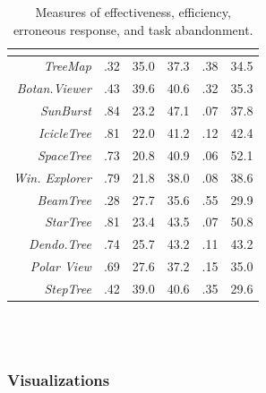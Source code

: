 \documentclass[twocolumn]{article}
\begin{document}
		\begin{table}[H]
			{\renewcommand{\arraystretch}{1.4}
				\begin{tabular}{|r*{5}{|m{.6cm}}|}
					 & \textbf{} & \textbf{} & \textbf{} & \textbf{} & \textbf{}\\
					\hline
					\textit{TreeMap} &  .32 & 35.0 & 37.3 & .38 & 34.5 \\
					\hline
					\textit{Botan.Viewer} & .43 & 39.6 & 40.6 & .32 & 35.3 \\
					\hline
					\textit{SunBurst} & .84 & 23.2 & 47.1 & .07 & 37.8 \\
					\hline
					\textit{IcicleTree } & .81 & 22.0 & 41.2 & .12 & 42.4 \\
					\hline
					\textit{SpaceTree} & .73 & 20.8 & 40.9 & .06 & 52.1 \\
					\hline
					\textit{Win. Explorer} & .79 & 21.8 & 38.0 & .08 & 38.6 \\
					\hline
					\textit{BeamTree} & .28 & 27.7 & 35.6 & .55 & 29.9 \\
					\hline
					\textit{StarTree} & .81 & 23.4 & 43.5 & .07 & 50.8 \\
					\hline
					\textit{Dendo.Tree} & .74 & 25.7 & 43.2 & .11 & 43.2 \\
					\hline
					\textit{Polar View} & .69 & 27.6 & 37.2 & .15 & 35.0 \\
					\hline
					\textit{StepTree} & .42 & 39.0 & 40.6 & .35 & 29.6 \\
					\hline
			\end{tabular}}\\\\
			\caption{Measures of effectiveness, efficiency, erroneous response, and task abandonment.}
		\end{table}
		
		\subsubsection{Visualizations}
		
\end{document}
